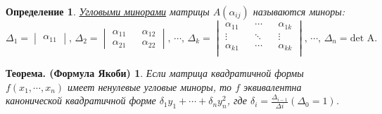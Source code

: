 \documentclass[../../main.tex]{subfiles}
\begin{document}
\newtheorem*{AngleMinorsDef}{Определение}
\begin{AngleMinorsDef}
\underline{Угловыми минорами} матрицы $ A(\alpha_{i j}) $ называются миноры:
\[
\Delta_{1} =
\begin{vmatrix}
  \alpha_{1 1}
\end{vmatrix}
\text{, }
\Delta_{2} =
\begin{vmatrix}
  \alpha_{1 1} && \alpha_{1 2} \\
  \alpha_{2 1} && \alpha_{2 2}
\end{vmatrix}
\text{, }
\cdots
\text{, }
\Delta_{k} =
  \begin{vmatrix}
    \alpha_{1 1} && \cdots && \alpha_{1 k}    \\
    \vdots && \ddots && \vdots                \\
    \alpha_{k 1} && \cdots && \alpha_{k k}    \\
  \end{vmatrix}
\text{, }
\cdots
\text{, }
\Delta_{n} = \text{det A.}
\]
\end{AngleMinorsDef}

\newtheorem*{YakobyTh}{Теорема. (Формула Якоби)}
\begin{YakobyTh}
Если матрица квадратичной формы $f(x_{1}, \cdots, x_{n})$ имеет ненулевые угловые миноры, то
$f$ эквивалентна канонической квадратичной форме $\delta_{1} y_{1} + \cdots + \delta_{n} y^{2}_{n}$,
где $\delta_{i} = \frac{\Delta_{i - 1}}{\Delta{i}} (\Delta_{0} = 1)$.
\end{YakobyTh}
\end{document}
